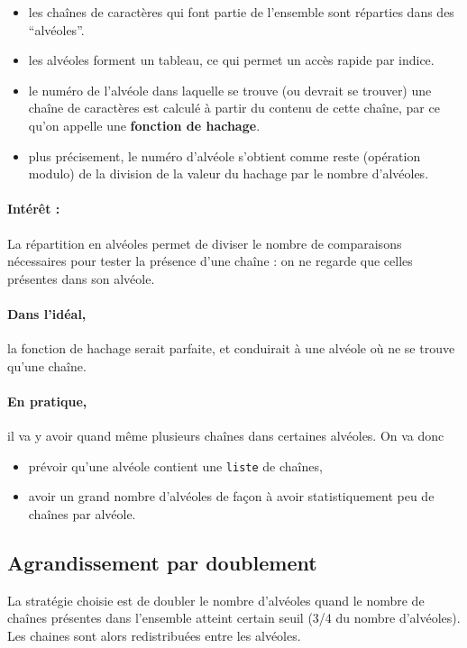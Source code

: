 \begin{itemize}
  \item les chaînes de caractères qui
    font partie de l'ensemble sont réparties dans des ``alvéoles''.
  \item les alvéoles forment un tableau, ce qui permet un
    accès rapide par indice.
  \item  le numéro de l'alvéole dans laquelle se trouve (ou
      devrait se trouver) une chaîne de caractères est calculé à
      partir du contenu de cette chaîne, par ce qu'on appelle une
      \textbf{fonction de hachage}.
    \item plus précisement, le numéro d'alvéole s'obtient comme reste (opération modulo)
      de la division de la valeur du hachage par le nombre d'alvéoles.
\end{itemize}

\paragraph{Intérêt :}
La répartition en alvéoles permet de diviser le nombre de comparaisons
nécessaires pour tester la présence d'une chaîne : on ne regarde que
celles présentes dans son alvéole.

\paragraph{Dans l'idéal,} la fonction de hachage serait parfaite, et conduirait à une alvéole où ne se trouve qu'une chaîne.

\paragraph{En pratique,} il va y avoir quand même plusieurs chaînes dans
certaines alvéoles. On va donc

\begin{itemize}
\item prévoir qu'une alvéole contient une \texttt{liste} de chaînes,
\item avoir un grand nombre d'alvéoles de
  façon à avoir statistiquement peu de chaînes par alvéole.
\end{itemize}

\subsection{Agrandissement par doublement}

La stratégie choisie est de doubler
le nombre d'alvéoles quand le nombre de chaînes
présentes dans l'ensemble atteint certain seuil (3/4 du nombre
d'alvéoles).  Les chaines sont alors redistribuées entre les
alvéoles.

